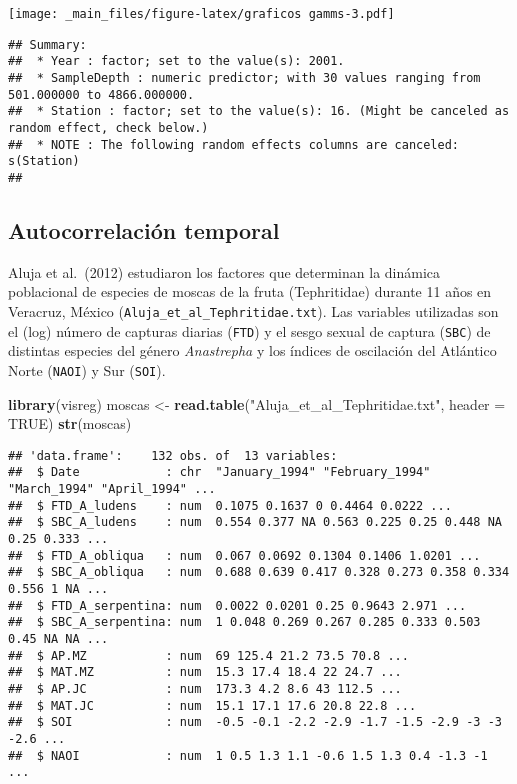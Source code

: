 \documentclass[
]{book}
\newenvironment{Shaded}{\begin{snugshade}}{\end{snugshade}}
\newcommand{\DataTypeTok}[1]{\textcolor[rgb]{0.13,0.29,0.53}{#1}}
\newcommand{\KeywordTok}[1]{\textcolor[rgb]{0.13,0.29,0.53}{\textbf{#1}}}
\newcommand{\NormalTok}[1]{#1}
\newcommand{\OtherTok}[1]{\textcolor[rgb]{0.56,0.35,0.01}{#1}}
\newcommand{\StringTok}[1]{\textcolor[rgb]{0.31,0.60,0.02}{#1}}
\begin{document}
\texttt{[image: \_main\_files/figure-latex/graficos gamms-3.pdf]}

\begin{verbatim}
## Summary:
##  * Year : factor; set to the value(s): 2001. 
##  * SampleDepth : numeric predictor; with 30 values ranging from 501.000000 to 4866.000000. 
##  * Station : factor; set to the value(s): 16. (Might be canceled as random effect, check below.) 
##  * NOTE : The following random effects columns are canceled: s(Station)
## 
\end{verbatim}

\hypertarget{autocorrelaciuxf3n-temporal}{%
\subsection{Autocorrelación temporal}\label{autocorrelaciuxf3n-temporal}}

Aluja et al.~(2012) estudiaron los factores que determinan la dinámica poblacional de especies de moscas de la fruta (Tephritidae) durante 11 años en Veracruz, México (\texttt{Aluja\_et\_al\_Tephritidae.txt}). Las variables utilizadas son el (log) número de capturas diarias (\texttt{FTD}) y el sesgo sexual de captura (\texttt{SBC}) de distintas especies del género \emph{Anastrepha} y los índices de oscilación del Atlántico Norte (\texttt{NAOI}) y Sur (\texttt{SOI}).

\begin{Shaded}
\begin{Highlighting}[]
\KeywordTok{library}\NormalTok{(visreg)}
\NormalTok{moscas <-}\StringTok{ }\KeywordTok{read.table}\NormalTok{(}\StringTok{"Aluja_et_al_Tephritidae.txt"}\NormalTok{, }\DataTypeTok{header =} \OtherTok{TRUE}\NormalTok{)}
\KeywordTok{str}\NormalTok{(moscas)}
\end{Highlighting}
\end{Shaded}

\begin{verbatim}
## 'data.frame':    132 obs. of  13 variables:
##  $ Date            : chr  "January_1994" "February_1994" "March_1994" "April_1994" ...
##  $ FTD_A_ludens    : num  0.1075 0.1637 0 0.4464 0.0222 ...
##  $ SBC_A_ludens    : num  0.554 0.377 NA 0.563 0.225 0.25 0.448 NA 0.25 0.333 ...
##  $ FTD_A_obliqua   : num  0.067 0.0692 0.1304 0.1406 1.0201 ...
##  $ SBC_A_obliqua   : num  0.688 0.639 0.417 0.328 0.273 0.358 0.334 0.556 1 NA ...
##  $ FTD_A_serpentina: num  0.0022 0.0201 0.25 0.9643 2.971 ...
##  $ SBC_A_serpentina: num  1 0.048 0.269 0.267 0.285 0.333 0.503 0.45 NA NA ...
##  $ AP.MZ           : num  69 125.4 21.2 73.5 70.8 ...
##  $ MAT.MZ          : num  15.3 17.4 18.4 22 24.7 ...
##  $ AP.JC           : num  173.3 4.2 8.6 43 112.5 ...
##  $ MAT.JC          : num  15.1 17.1 17.6 20.8 22.8 ...
##  $ SOI             : num  -0.5 -0.1 -2.2 -2.9 -1.7 -1.5 -2.9 -3 -3 -2.6 ...
##  $ NAOI            : num  1 0.5 1.3 1.1 -0.6 1.5 1.3 0.4 -1.3 -1 ...
\end{verbatim}
\end{document}
